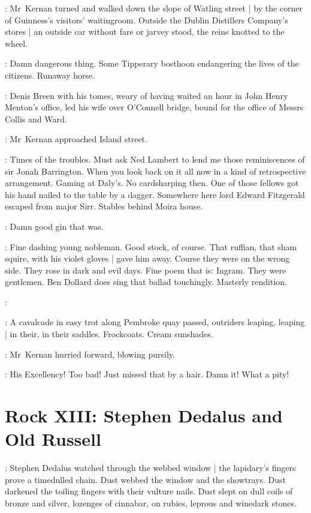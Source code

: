 :
Mr~Kernan turned and walked down the slope of Watling street |
by the corner of Guinness's visitors' waitingroom.
Outside the Dublin Distillers Company's stores |
an outside car without fare or jarvey stood,
the reins knotted to the wheel.

:
Damn dangerous thing.
Some Tipperary bosthoon
endangering the lives of the citizens.
Runaway horse.

\begin{interject}
    :
    Denis Breen with his tomes,
    weary of having waited an hour in John Henry Menton's office,
    led his wife over O'Connell bridge,
    bound for the office
    of Messrs Collis and Ward.
\end{interject}%

:
Mr~Kernan approached Island street.

:
Times of the troubles.
Must ask Ned Lambert to lend me
those reminiscences of sir Jonah Barrington.
When you look back on it all now
in a kind of retrospective arrangement.
Gaming at Daly's.
No cardsharping then.
One of those fellows got his hand nailed to the table by a dagger.
Somewhere here lord Edward Fitzgerald escaped from major Sirr.
Stables behind Moira house.

:
Damn good gin that was.

:
Fine dashing young nobleman.
Good stock, of course.
That ruffian, that sham squire, with his violet gloves |
gave him away.
Course they were on the wrong side.%
They rose in dark and evil days.
Fine poem that is:
Ingram.
They were gentlemen.
Ben Dollard does sing that ballad touchingly.
Masterly rendition.

:

:
A cavalcade in easy trot along Pembroke quay passed,
outriders leaping, leaping |
in their, in their saddles.
Frockcoats.
Cream sunshades.

:
Mr~Kernan hurried forward,
blowing pursily.

:
His Excellency!
Too bad!
Just missed that by a hair.
Damn it!
What a pity!


\section*{Rock XIII: Stephen Dedalus and Old Russell}


:
Stephen Dedalus watched through the webbed window |
the lapidary's fingers prove a timedulled chain.
Dust webbed the window and the showtrays.
Dust darkened the toiling fingers with their vulture nails.
Dust slept on dull coils of bronze and silver,
lozenges of cinnabar,
on rubies,
leprous and winedark stones.

